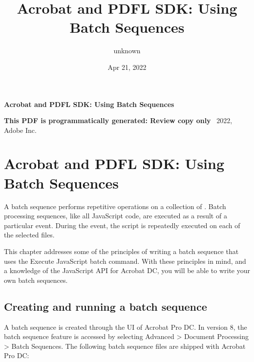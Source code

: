 \documentclass[letterpaper,12pt,english,openany,oneside]{sphinxmanual}
\title{Acrobat and PDFL SDK: Using Batch Sequences}
\date{Apr 21, 2022}
\author{unknown}
\begin{document}
\pagestyle{empty}

    \begin{titlepage}
        \begin{figure}[h]
        \end{figure}
        \centering
        \vspace*{40mm}
        \textbf{\Huge Acrobat and PDFL SDK: Using Batch Sequences}

        \vspace{15mm}
        \Large \textbf{{This PDF is programmatically generated: Review copy only}}
        \vfill
        \small \textcopyright\ 2022, Adobe Inc.
    \end{titlepage}
    \clearpage
    \tableofcontents
    \clearpage
    
\pagestyle{plain}

\pagestyle{normal}
\label{\detokenize{toc::doc}}



\chapter{Acrobat and PDFL SDK: Using Batch Sequences}
\label{\detokenize{index:acrobat-and-pdfl-sdk-using-batch-sequences}}\label{\detokenize{index::doc}}
A batch sequence performs repetitive operations on a collection of  . Batch processing sequences, like all JavaScript code, are executed as a result of a particular event. During the event, the script is repeatedly executed on each of the selected files.

This chapter addresses some of the principles of writing a batch sequence that uses the Execute JavaScript batch command. With these principles in mind, and a knowledge of the JavaScript API for Acrobat DC, you will be able to write your own batch sequences.


\section{Creating and running a batch sequence}
\label{\detokenize{index:creating-and-running-a-batch-sequence}}
A batch sequence is created through the UI of Acrobat Pro DC. In version 8, the batch sequence feature is accessed by selecting Advanced > Document Processing > Batch Sequences. The following batch sequence files are shipped with Acrobat Pro DC:
\end{document}
